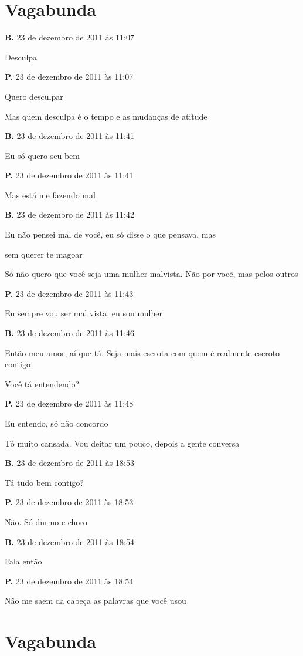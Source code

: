 \chapter{Vagabunda}

{\parindent0pt\parskip1pt\raggedright
\textbf{B.} 23 de dezembro de 2011 às 11:07

Desculpa

\textbf{P.} 23 de dezembro de 2011 às 11:07

Quero desculpar

Mas quem desculpa é o tempo e as mudanças de atitude

\textbf{B.} 23 de dezembro de 2011 às 11:41

Eu só quero seu bem

\textbf{P.} 23 de dezembro de 2011 às 11:41

Mas está me fazendo mal

\textbf{B.} 23 de dezembro de 2011 às 11:42

Eu não pensei mal de você, eu só disse o que pensava, mas

sem querer te magoar

Só não quero que você seja uma mulher malvista. Não por você, mas pelos
outros

\textbf{P.} 23 de dezembro de 2011 às 11:43

Eu sempre vou ser mal vista, eu sou mulher

\textbf{B.} 23 de dezembro de 2011 às 11:46

Então meu amor, aí que tá. Seja mais escrota com quem é realmente
escroto contigo

Você tá entendendo?

\textbf{P.} 23 de dezembro de 2011 às 11:48

Eu entendo, só não concordo

Tô muito cansada. Vou deitar um pouco, depois a gente conversa

\textbf{B.} 23 de dezembro de 2011 às 18:53

Tá tudo bem contigo?

\textbf{P.} 23 de dezembro de 2011 às 18:53

Não. Só durmo e choro

\textbf{B.} 23 de dezembro de 2011 às 18:54

Fala então

\textbf{P.} 23 de dezembro de 2011 às 18:54

Não me saem da cabeça as palavras que você usou
}

\chapter{Vagabunda}

